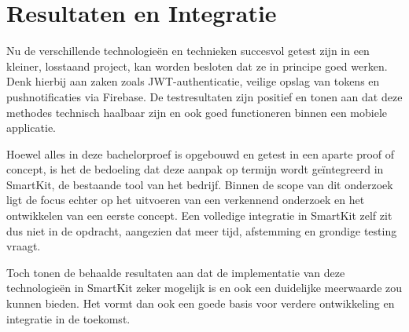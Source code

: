 \section{Resultaten en Integratie}

Nu de verschillende technologieën en technieken succesvol getest zijn in een kleiner, losstaand project, kan worden besloten dat ze in principe goed werken. Denk hierbij aan zaken zoals JWT-authenticatie, veilige opslag van tokens en pushnotificaties via Firebase. De testresultaten zijn positief en tonen aan dat deze methodes technisch haalbaar zijn en ook goed functioneren binnen een mobiele applicatie.

Hoewel alles in deze bachelorproef is opgebouwd en getest in een aparte proof of concept, is het de bedoeling dat deze aanpak op termijn wordt geïntegreerd in SmartKit, de bestaande tool van het bedrijf. Binnen de scope van dit onderzoek ligt de focus echter op het uitvoeren van een verkennend onderzoek en het ontwikkelen van een eerste concept. Een volledige integratie in SmartKit zelf zit dus niet in de opdracht, aangezien dat meer tijd, afstemming en grondige testing vraagt.

Toch tonen de behaalde resultaten aan dat de implementatie van deze technologieën in SmartKit zeker mogelijk is en ook een duidelijke meerwaarde zou kunnen bieden. Het vormt dan ook een goede basis voor verdere ontwikkeling en integratie in de toekomst.
